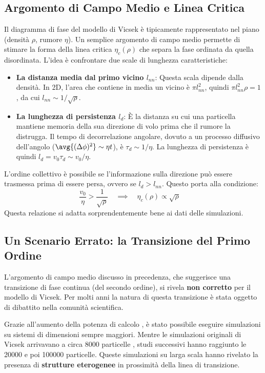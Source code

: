\subsection{Argomento di Campo Medio e Linea Critica}
Il diagramma di fase del modello di Vicsek è tipicamente rappresentato nel piano (densità $\rho$, rumore $\eta$). Un semplice argomento di campo medio permette di stimare la forma della linea critica $\eta_c(\rho)$ che separa la fase ordinata da quella disordinata. L'idea è confrontare due scale di lunghezza caratteristiche:
\begin{itemize}
    \item \textbf{La distanza media dal primo vicino $l_{nn}$}: Questa scala dipende dalla densità. In 2D, l'area che contiene in media un vicino è $\pi l_{nn}^2$, quindi $\pi l_{nn}^2 \rho = 1$, da cui $l_{nn} \sim 1/\sqrt{\rho}$.
    \item \textbf{La lunghezza di persistenza $l_d$}: È la distanza su cui una particella mantiene memoria della sua direzione di volo prima che il rumore la distrugga. Il tempo di decorrelazione angolare, dovuto a un processo diffusivo dell'angolo ($\avg{(\Delta\phi)^2} \sim \eta t$), è $\tau_d \sim 1/\eta$. La lunghezza di persistenza è quindi $l_d = v_0 \tau_d \sim v_0/\eta$.
\end{itemize}
L'ordine collettivo è possibile se l'informazione sulla direzione può essere trasmessa prima di essere persa, ovvero se $l_d > l_{nn}$. Questo porta alla condizione:
\begin{equation}
    \frac{v_0}{\eta} > \frac{1}{\sqrt{\rho}} \quad \implies \quad \eta_c(\rho) \propto \sqrt{\rho} \quad \text{}
\end{equation}
Questa relazione si adatta sorprendentemente bene ai dati delle simulazioni.

\subsection{Un Scenario Errato: la Transizione del Primo Ordine}
L'argomento di campo medio discusso in precedenza, che suggerisce una transizione di fase continua (del secondo ordine), si rivela \textbf{non corretto} per il modello di Vicsek. Per molti anni la natura di questa transizione è stata oggetto di dibattito nella comunità scientifica.

Grazie all'aumento della potenza di calcolo , è stato possibile eseguire simulazioni su sistemi di dimensioni sempre maggiori. Mentre le simulazioni originali di Vicsek arrivavano a circa 8000 particelle , studi successivi hanno raggiunto le 20000 e poi 100000 particelle. Queste simulazioni su larga scala hanno rivelato la presenza di \textbf{strutture eterogenee} in prossimità della linea di transizione.

